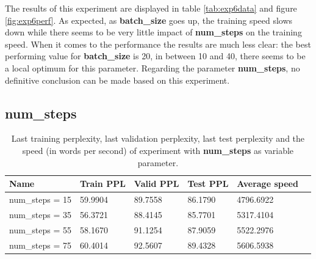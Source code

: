 \documentclass[10pt,a4paper,titlepage]{article}
\begin{document}
The results of this experiment are displayed in table \ref{tab:exp6data} and figure \ref{fig:exp6perf}. As expected,  as \textbf{batch\_size} goes up, the training speed slows down while there seems to be very little impact of \textbf{num\_steps} on the training speed. When it comes to the performance the results are much less clear: the best performing value for \textbf{batch\_size} is 20, in between 10 and 40, there seems to be a local optimum for this parameter. Regarding the parameter \textbf{num\_steps}, no definitive conclusion can be made based on this experiment.

\newpage

\subsection{num\_steps}

\begin{table}[H]
\centering
\caption{Last training perplexity, last validation perplexity, last test perplexity and the speed (in words per second) of experiment with \textbf{num\_steps} as variable parameter.}
\label{tab:exp7data}
\begin{tabular}{|l|l|l|l|l|l|}
\hline
{\small Name} & {\small Train PPL} & {\small Valid PPL} & {\small Test PPL} & {\small Average speed}\\ \hline
{\small num\_steps = 15}                                & 59.9904    & 89.7558    & 86.1790    & 4796.6922  \\ \hline
{\small num\_steps = 35}                                & 56.3721    & 88.4145    & 85.7701    & 5317.4104  \\ \hline
{\small num\_steps = 55}                                & 58.1670    & 91.1254    & 87.9059    & 5522.2976  \\ \hline
{\small num\_steps = 75}                                & 60.4014    & 92.5607    & 89.4328    & 5606.5938  \\ \hline
\end{tabular}
\end{table}
\end{document}
